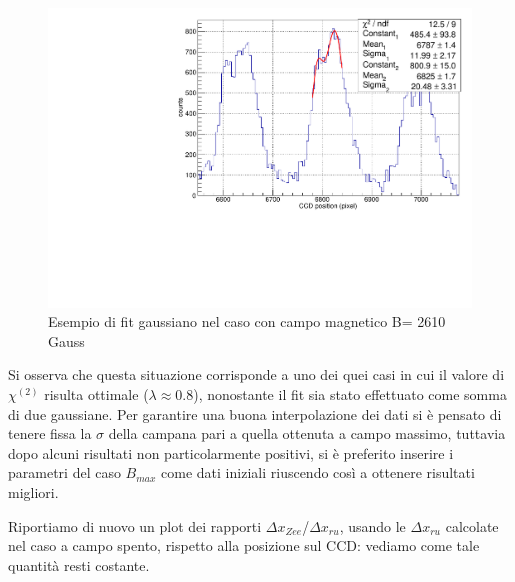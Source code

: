 \documentclass{article}
\begin{document}
	
	\begin{center}
	\begin{figure}[H]
		\centering
		\includegraphics[scale=0.38, angle=0]{campomin/singolo.pdf}
		\caption{ Esempio di fit gaussiano nel caso con campo magnetico B= 2610 Gauss}
		\label{fig:singoloBonMin}
	\end{figure}
	\end{center}

	Si osserva che questa situazione corrisponde a uno dei quei casi in cui il valore di
	$\chi^{(2)}$ risulta ottimale ($\lambda\approx 0.8$), nonostante il fit sia stato effettuato
	come somma di due gaussiane.
	Per garantire una buona interpolazione dei dati si è pensato di tenere fissa la $\sigma$
	della campana pari a quella ottenuta a campo massimo, tuttavia dopo alcuni risultati non
	particolarmente positivi, si è preferito inserire i parametri del caso $B_{max}$ come
	dati iniziali riuscendo così a ottenere risultati migliori.


	Riportiamo di nuovo un plot dei rapporti $\Delta x_{Zee}$/$\Delta x_{ru}$, usando le $\Delta x_{ru}$
	calcolate nel caso a campo spento, rispetto alla posizione sul CCD: vediamo come tale quantità resti 
	costante.
\end{document}
